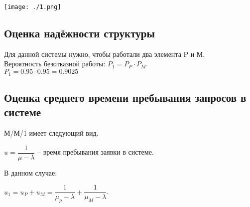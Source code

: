 \documentclass[12pt, a4paper] {ncc}
\begin{document}
	\texttt{[image: ./1.png]}
    \subsection{Оценка надёжности структуры}

		Для данной системы нужно, чтобы работали два элемента P и М. \\
	    Вероятность безотказной работы: $P_1 = P_P \cdot P_M$.\\
		$P_1 = 0.95 \cdot 0.95 = 0.9025$


        \subsection{Оценка среднего времени пребывания запросов в системе}

			М/М/1 имеет следующий вид.\\

            \begin{center}
            \end{center}

			$u = \dfrac {1} {\mu - \lambda} $ -- время пребывания заявки в системе.

			В данном случае:

			$u_1 = u_P + u_M = \dfrac {1} {\mu_p - \lambda} + \dfrac {1} {\mu_M - \lambda}$.
\end{document}
